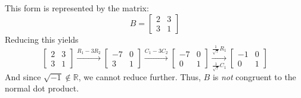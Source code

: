 \documentclass[11pt]{article}
\newcommand{\R}{\mathbb{R}}
\begin{document}
\begin{problem}
\begin{parts}
    \begin{solution}
      This form is represented by the matrix:
      \[
        B=
        \begin{bmatrix}
          2 & 3 \\
          3 & 1
        \end{bmatrix}
      \]
      Reducing this yields
      \[
        \begin{bmatrix}
          2 & 3 \\
          3 & 1
        \end{bmatrix}\xrightarrow{R_1 - 3R_2}
        \begin{bmatrix}
          -7 & 0 \\
          3 & 1
        \end{bmatrix}\xrightarrow{C_1 - 3C_2}
        \begin{bmatrix}
          -7 & 0 \\
          0 & 1
        \end{bmatrix}\xrightarrow[\frac{1}{\sqrt{7}}C_1]{\frac{1}{\sqrt{7}}R_1}
        \begin{bmatrix}
          -1 & 0 \\
          0 & 1
        \end{bmatrix}
      \]
      And since \( \sqrt{-1}\not\in\R \), we cannot reduce further.
      Thus, \( B \) is \emph{not} congruent to the normal dot product.
    \end{solution}

  \end{parts}
\end{problem}
\end{document}
